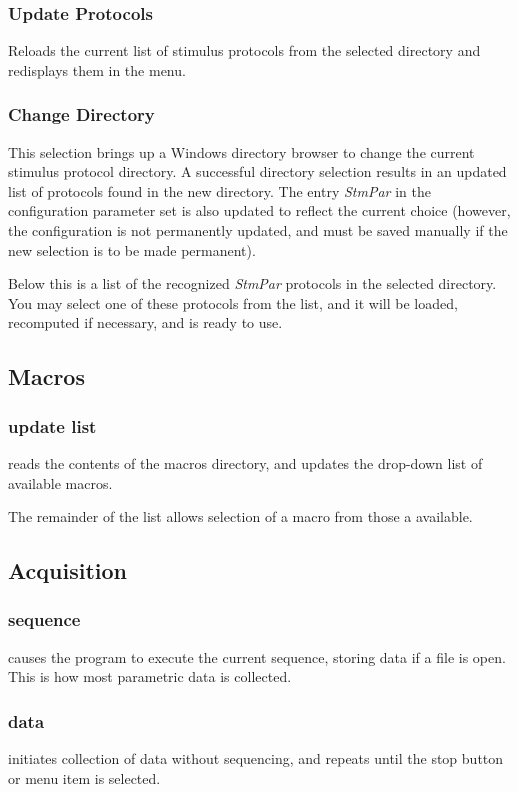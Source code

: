 \documentclass[11pt, letterpaper, titlepage]{paper}
\begin{document}
\subsubsection{Update Protocols} Reloads the current list of 
stimulus protocols from the selected directory and redisplays them 
in the menu.

\subsubsection{Change Directory} This selection brings 
up a Windows directory browser to change the current stimulus 
protocol directory. A successful directory selection results in an 
updated list of protocols found in the new directory. The entry 
\textsl{StmPar} in the configuration parameter set is also updated 
to reflect the current choice (however, the configuration is not 
permanently updated, and must be saved manually if the new 
selection is to be made permanent).

Below this is a list of the recognized \textsl{StmPar} protocols 
in the selected directory. You may select one of these protocols 
from the list, and it will be loaded, recomputed if necessary, and 
is ready to use.

\subsection{Macros}

\subsubsection{update list} reads the contents of the macros directory, and 
updates the drop-down list of available macros.

The remainder of the list allows selection of a macro from those a 
available.

\subsection{Acquisition}

\subsubsection{sequence} causes the program to execute the 
current sequence, storing data if a file is open. This is how most 
parametric data is collected.

\subsubsection{data} initiates collection of data without 
sequencing, and repeats until the stop button or menu item is 
selected.
\end{document}

